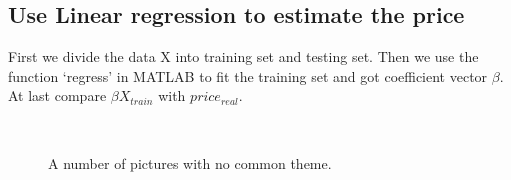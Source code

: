 \documentclass[
10pt, %
a4paper, %
oneside, %
headinclude,footinclude, %
BCOR5mm, %
]{scrartcl}
\begin{document}
\subsection{Use Linear regression to estimate the price}
First we divide the data X into training set and testing set. Then we use the function ‘regress’ in MATLAB to fit the training set and got coefficient vector $\beta$. At last compare $\beta X_{train}$ with $price_{real}$.  


\begin{figure}[h]
\centering
{} \quad
{} \\
 \quad
{}
\caption[A number of pictures.]{A number of pictures with no common theme.} %
\label{fig:esempio}
\end{figure}
\end{document}
